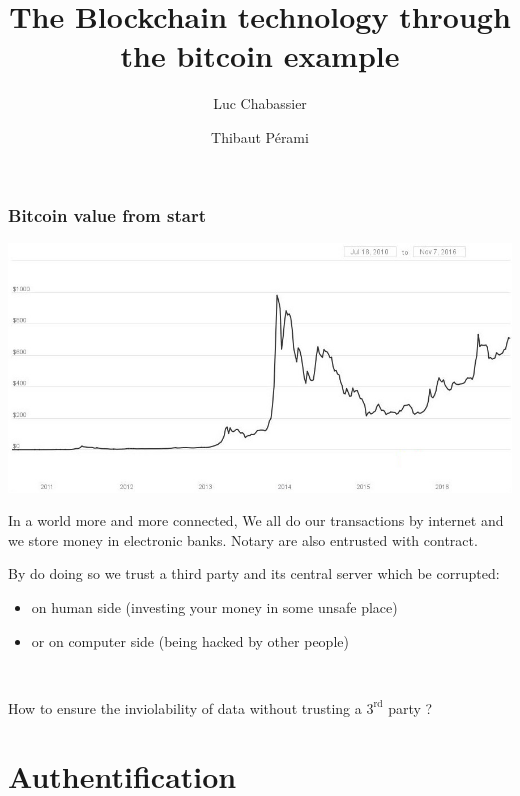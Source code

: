 \documentclass[12pt]{beamer}
\title{The Blockchain technology through the bitcoin example}
\author{Luc Chabassier \and Thibaut Pérami}
\institute{École Normale Supérieure}
\begin{document}
\begin{frame}
\frametitle{Bitcoin value from start}
 \includegraphics[scale =0.3]{FirstImage.jpeg}

\end{frame}

\begin{frame}
    \maketitle
\end{frame}

\begin{frame}
In a world more and more connected, We all do our transactions by internet and we store money in electronic banks. Notary are also entrusted with contract.

By do doing so we trust a third party and its central server which be corrupted:
\begin{itemize}
 \item on human side (investing your money in some unsafe place)
 \item or on computer side (being hacked by other people)
 \end{itemize}

\

How to ensure the inviolability of data without trusting a $3^{\mathrm {rd}}$ party ?

\end{frame}

\begin{frame}

\tableofcontents

\end{frame}

\section{Authentification}
\end{document}
